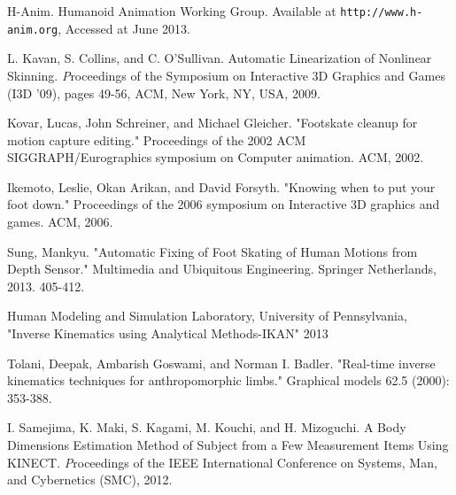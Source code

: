 \documentclass[number,preprint,review,12pt]{elsarticle}
\begin{document}
\begin{thebibliography}{}
H-Anim. Humanoid Animation Working Group. Available at \verb+http://www.h-anim.org+, Accessed at June 2013.

L. Kavan, S. Collins, and C. O'Sullivan. Automatic Linearization of Nonlinear Skinning. {\textit Proceedings of the Symposium on Interactive 3D Graphics and Games (I3D '09)}, pages 49-56, ACM, New York, NY, USA, 2009.

Kovar, Lucas, John Schreiner, and Michael Gleicher. "Footskate cleanup for motion capture editing." Proceedings of the 2002 ACM SIGGRAPH/Eurographics symposium on Computer animation. ACM, 2002.

Ikemoto, Leslie, Okan Arikan, and David Forsyth. "Knowing when to put your foot down." Proceedings of the 2006 symposium on Interactive 3D graphics and games. ACM, 2006.

Sung, Mankyu. "Automatic Fixing of Foot Skating of Human Motions from Depth Sensor." Multimedia and Ubiquitous Engineering. Springer Netherlands, 2013. 405-412.

Human Modeling and Simulation Laboratory, University of Pennsylvania, "Inverse Kinematics using Analytical Methods-IKAN" 2013

Tolani, Deepak, Ambarish Goswami, and Norman I. Badler. "Real-time inverse kinematics techniques for anthropomorphic limbs." Graphical models 62.5 (2000): 353-388.

I. Samejima, K. Maki, S. Kagami, M. Kouchi, and H. Mizoguchi. A Body Dimensions Estimation Method of Subject from a Few Measurement Items Using KINECT. {\textit Proceedings of the IEEE International Conference on Systems, Man, and Cybernetics (SMC)}, 2012.

\end{thebibliography}
\end{document}

